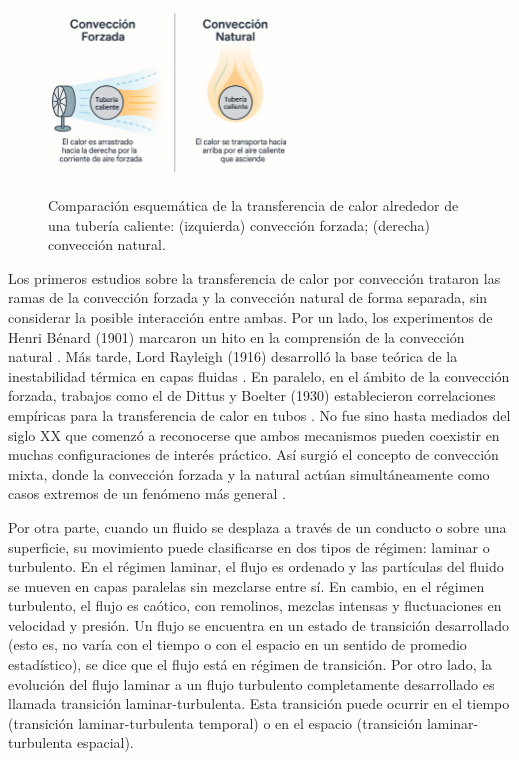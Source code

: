 \begin{figure}[H]
 \centering
    \includegraphics[width=0.6\textwidth]{figures/cap1/natural_forzada.png}
    \label{fig:natural_forzada} 
 \caption{Comparación esquemática de la transferencia de calor alrededor de una tubería caliente: (izquierda) convección forzada; (derecha) convección natural.} 
 \label{fig:natural_forzada}
\end{figure}


Los primeros estudios sobre la transferencia de calor por convección trataron las ramas de la convección forzada y la convección natural de forma separada, sin considerar la posible interacción entre ambas. Por un lado, los experimentos de Henri Bénard (1901) marcaron un hito en la comprensión de la convección natural \cite{benard1901}. Más tarde, Lord Rayleigh (1916) desarrolló la base teórica de la inestabilidad térmica en capas fluidas \cite{rayleigh1916}. En paralelo, en el ámbito de la convección forzada, trabajos como el de Dittus y Boelter (1930) establecieron correlaciones empíricas para la transferencia de calor en tubos \cite{dittus1930}. No fue sino hasta mediados del siglo XX que comenzó a reconocerse que ambos mecanismos pueden coexistir en muchas configuraciones de interés práctico. Así surgió el concepto de convección mixta, donde la convección forzada y la natural actúan simultáneamente como casos extremos de un fenómeno más general \cite{tao1960,metais1964}. 

Por otra parte, cuando un fluido se desplaza a través de un conducto o sobre una superficie, su movimiento puede clasificarse en dos tipos de régimen: laminar o turbulento. En el régimen laminar, el flujo es ordenado y las partículas del fluido se mueven en capas paralelas sin mezclarse entre sí. En cambio, en el régimen turbulento, el flujo es caótico, con remolinos, mezclas intensas y fluctuaciones en velocidad y presión. Un flujo se encuentra en un estado de transición desarrollado (esto es, no varía con el tiempo o con el espacio en un sentido de promedio estadístico), se dice que el flujo está en régimen de transición. Por otro lado, la evolución del flujo laminar a un flujo turbulento completamente desarrollado es llamada transición laminar-turbulenta. Esta transición puede ocurrir en el tiempo (transición laminar-turbulenta temporal) o en el espacio (transición laminar-turbulenta espacial).

